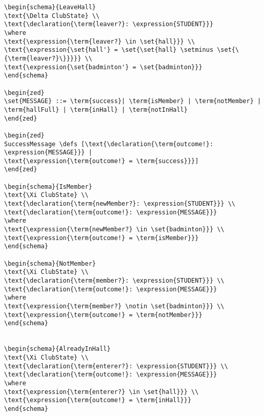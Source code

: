 \begin{verbatim}
\begin{schema}{LeaveHall}
\text{\Delta ClubState} \\
\text{\declaration{\term{leaver?}: \expression{STUDENT}}}
\where
\text{\expression{\term{leaver?} \in \set{hall}}} \\
\text{\expression{\set{hall'} = \set{\set{hall} \setminus \set{\{\term{leaver?}\}}}}} \\
\text{\expression{\set{badminton'} = \set{badminton}}}
\end{schema}

\begin{zed}
\set{MESSAGE} ::= \term{success}| \term{isMember} | \term{notMember} | \term{hallFull} | \term{inHall} | \term{notInHall}
\end{zed}

\begin{zed}
SuccessMessage \defs [\text{\declaration{\term{outcome!}: \expression{MESSAGE}}} |
\text{\expression{\term{outcome!} = \term{success}}}]
\end{zed}

\begin{schema}{IsMember}
\text{\Xi ClubState} \\
\text{\declaration{\term{newMember?}: \expression{STUDENT}}} \\
\text{\declaration{\term{outcome!}: \expression{MESSAGE}}}
\where
\text{\expression{\term{newMember?} \in \set{badminton}}} \\
\text{\expression{\term{outcome!} = \term{isMember}}}
\end{schema}

\begin{schema}{NotMember}
\text{\Xi ClubState} \\
\text{\declaration{\term{member?}: \expression{STUDENT}}} \\
\text{\declaration{\term{outcome!}: \expression{MESSAGE}}}
\where
\text{\expression{\term{member?} \notin \set{badminton}}} \\
\text{\expression{\term{outcome!} = \term{notMember}}}
\end{schema}


\begin{schema}{AlreadyInHall}
\text{\Xi ClubState} \\
\text{\declaration{\term{enterer?}: \expression{STUDENT}}} \\
\text{\declaration{\term{outcome!}: \expression{MESSAGE}}}
\where
\text{\expression{\term{enterer?} \in \set{hall}}} \\
\text{\expression{\term{outcome!} = \term{inHall}}}
\end{schema}


\end{verbatim}
